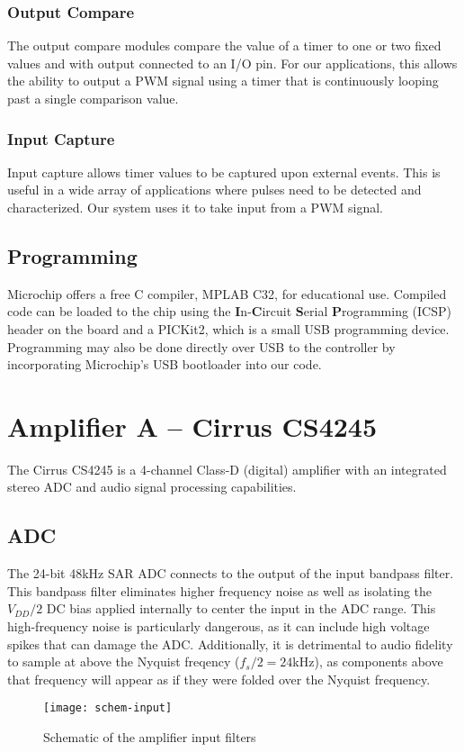 \subsubsection{Output Compare}
The output compare modules compare the value of a timer to one or two fixed values and with output connected to an I/O pin. For our applications, this allows the ability to output a PWM signal using a timer that is continuously looping past a single comparison value.
\subsubsection{Input Capture}
Input capture allows timer values to be captured upon external events. This is useful in a wide array of applications where pulses need to be detected and characterized. Our system uses it to take input from a PWM signal.

\subsection{Programming}
Microchip offers a free C compiler, MPLAB C32, for educational use. Compiled code can be loaded to the chip using the \textbf{I}n-\textbf{C}ircuit \textbf{S}erial \textbf{P}rogramming (ICSP) header on the board and a PICKit2, which is a small USB programming device. Programming may also be done directly over USB to the controller by incorporating Microchip's USB bootloader into our code.

\section{Amplifier A -- Cirrus CS4245}
The Cirrus CS4245 is a 4-channel Class-D (digital) amplifier with an integrated stereo ADC and audio signal processing capabilities.

\subsection{ADC}
The 24-bit 48kHz SAR ADC connects to the output of the input bandpass filter. This bandpass filter eliminates higher frequency noise as well as isolating the $V_{DD}/2$ DC bias applied internally to center the input in the ADC range. This high-frequency noise is particularly dangerous, as it can include high voltage spikes that can damage the ADC. Additionally, it is detrimental to audio fidelity to sample at above the Nyquist freqency ($f_s/2 = 24$kHz), as components above that frequency will appear as if they were folded over the Nyquist frequency.
\begin{figure}[H]
	\centering
	\texttt{[image: schem-input]}
	\caption[Schematic -- Analog Input Filtering]%
	{Schematic of the amplifier input filters}
\end{figure}

